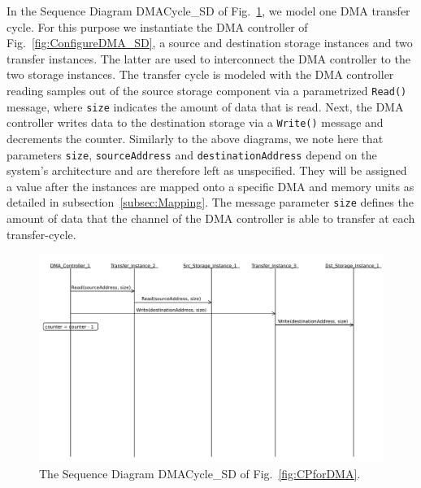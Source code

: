 \documentclass{llncs}
\begin{document}
In the Sequence Diagram DMACycle\_SD of Fig.~\ref{fig:DMACycle_SD}, we model
one DMA transfer cycle. For this purpose we instantiate the DMA controller of Fig.~\ref{fig:ConfigureDMA_SD}, a source and destination storage instances and two transfer instances. The latter are used to interconnect the DMA controller to the two storage instances. The transfer
cycle is modeled with the DMA controller reading samples out of the source
storage component via a parametrized {\tt Read()} message, where {\tt size} indicates the amount of data that is read. Next, the DMA controller writes data to the
destination storage via a {\tt Write()} message and decrements the counter.
Similarly to the above diagrams, we note here that parameters {\tt size}, {\tt sourceAddress} and {\tt destinationAddress} depend on the system's architecture
and are therefore left as unspecified. They will be assigned a value after the instances are mapped onto a specific DMA
and memory units as detailed in subsection~\ref{subsec:Mapping}. The message parameter \texttt{size} defines the amount
of data that the channel of the DMA controller is able to transfer at each transfer-cycle.
%
\begin{figure}[!htbp]
	\centering
	\includegraphics[trim= 0cm 10cm 0cm 0cm, clip,
	width=\textwidth]{figures/DMACycle_SD.pdf}
	\caption{The Sequence Diagram DMACycle\_SD of Fig.~\ref{fig:CPforDMA}.}
	\label{fig:DMACycle_SD}
\end{figure}
%
\end{document}
